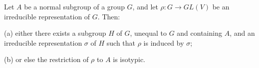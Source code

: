 Let $A$ be a normal subgroup of a group $G$, and let $\rho: G \rightarrow GL(V)$ be an irreducible representation of $G$. Then:

(a) either there exists a subgroup $H$ of $G$, unequal to $G$ and containing $A$, and an irreducible representation $\sigma$ of $H$ such that $\rho$ is induced by $\sigma$;

(b) or else the restriction of $\rho$ to $A$ is isotypic.
